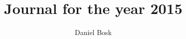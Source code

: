 \documentclass[a4paper,justified,symmetric,nobib,marginals=raggedouter]{tufte-book}
\title{Journal for the year 2015}
\author{Daniel Bosk}
\begin{document}
\maketitle
\tableofcontents

\newrefsection

%
%
%
%
%
%
%
%
%
%
%

\printindex
\end{document}

